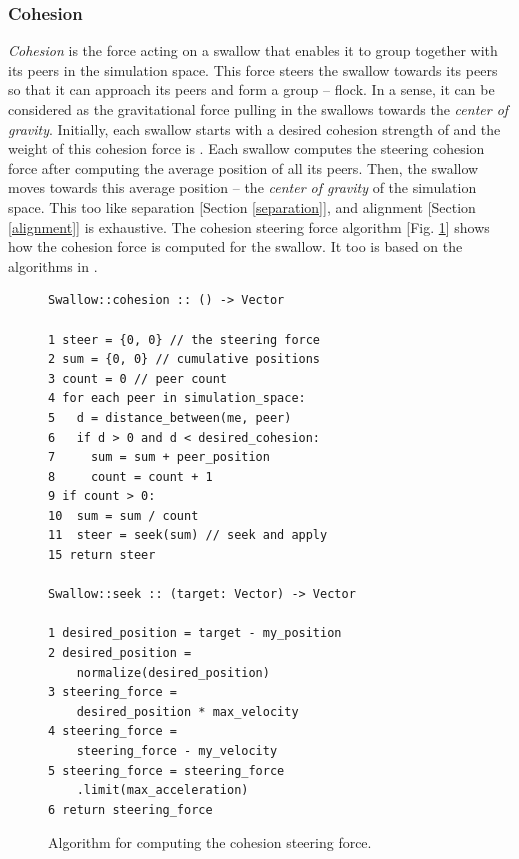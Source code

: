 \documentclass[../main]{subfiles}
\begin{document}
\subsubsection{Cohesion}
\label{cohesion}

{\em Cohesion} is the force acting on a swallow that enables it to group together with its peers in the simulation space. This force steers the swallow towards its peers so that it can approach its peers and form a group -- flock.
In a sense, it can be considered as the gravitational force pulling in the swallows towards the {\em center of gravity}. Initially, each swallow starts with a desired cohesion strength of  and the weight of this cohesion force is . Each swallow computes the steering cohesion force after computing the average position of all its peers. Then, the swallow moves towards this average position -- the {\em center of gravity} of the simulation space. This too like separation [Section \ref{separation}], and alignment [Section \ref{alignment}] is exhaustive. The cohesion steering force algorithm [Fig. \ref{cohesionLogic}] shows how the cohesion force is computed for the swallow. It too is based on the algorithms in \cite{reynolds1999steering, danshiffman}.

\begin{figure}
	\begin{verbatim}
Swallow::cohesion :: () -> Vector

1 steer = {0, 0} // the steering force
2 sum = {0, 0} // cumulative positions
3 count = 0 // peer count
4 for each peer in simulation_space:
5   d = distance_between(me, peer)
6   if d > 0 and d < desired_cohesion:
7     sum = sum + peer_position
8     count = count + 1
9 if count > 0:
10  sum = sum / count
11  steer = seek(sum) // seek and apply
15 return steer

Swallow::seek :: (target: Vector) -> Vector

1 desired_position = target - my_position
2 desired_position = 
    normalize(desired_position)
3 steering_force = 
    desired_position * max_velocity
4 steering_force = 
    steering_force - my_velocity
5 steering_force = steering_force
    .limit(max_acceleration)
6 return steering_force
    \end{verbatim}
	\caption{Algorithm for computing the cohesion steering force.}
	\label{cohesionLogic}
\end{figure}
\end{document}
